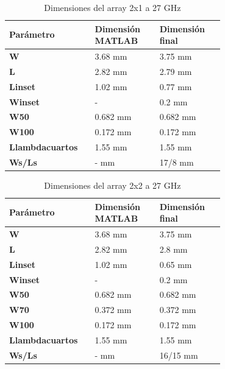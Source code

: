 \begin{table}[H]
  
   \small %
   \centering %
   \begin{tabular}{m{0.2\linewidth}m{0.25\linewidth}m{0.25\linewidth}} %
   \toprule[\heavyrulewidth]\toprule[\heavyrulewidth]
   \textbf{Parámetro} & \textbf{Dimensión MATLAB} & \textbf{Dimensión final} \\ 
   \midrule
   \textbf{W} & 3.68 mm & 3.75 mm \\
   \textbf{L} & 2.82 mm & 2.79 mm\\
   \textbf{Linset} & 1.02 mm & 0.77 mm\\
   \textbf{Winset} & - & 0.2 mm\\
   \textbf{W50} & 0.682 mm & 0.682 mm\\
   \textbf{W100} & 0.172 mm & 0.172 mm\\
   \textbf{Llambdacuartos} & 1.55 mm & 1.55 mm\\
   \textbf{Ws/Ls} & - mm & 17/8 mm\\
   \bottomrule[\heavyrulewidth] 
   \end{tabular}
   \caption{Dimensiones del array 2x1 a 27 GHz} 
      \label{tab:2x13}
\end{table}



\begin{table}[H]
  
   \small %
   \centering %
   \begin{tabular}{m{0.2\linewidth}m{0.25\linewidth}m{0.25\linewidth}} %
   \toprule[\heavyrulewidth]\toprule[\heavyrulewidth]
   \textbf{Parámetro} & \textbf{Dimensión MATLAB} & \textbf{Dimensión final} \\ 
   \midrule
   \textbf{W} & 3.68 mm & 3.75 mm \\
   \textbf{L} & 2.82 mm & 2.8 mm\\
   \textbf{Linset} & 1.02 mm & 0.65 mm\\
   \textbf{Winset} & - & 0.2 mm\\
   \textbf{W50} & 0.682 mm & 0.682 mm\\
   \textbf{W70} & 0.372 mm & 0.372 mm\\
   \textbf{W100} & 0.172 mm & 0.172 mm\\
   \textbf{Llambdacuartos} & 1.55 mm & 1.55 mm\\
   \textbf{Ws/Ls} & - mm & 16/15 mm\\
   \bottomrule[\heavyrulewidth] 
   \end{tabular}
   \caption{Dimensiones del array 2x2 a 27 GHz} 
      \label{tab:2x23}
\end{table}